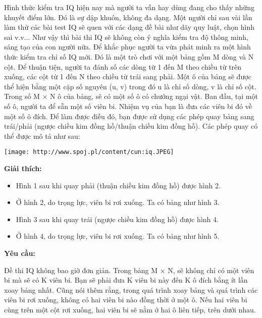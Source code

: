 Hình thức kiểm tra IQ hiện nay mà người ta vẫn hay dùng đang cho thấy những khuyết điểm lớn. Đó là sự dập khuôn, không đa dạng. Một người chỉ sau vài lần làm thử các bài test IQ sẽ quen với các dạng đề bài như dãy quy luật, chọn hình sai v.v... Như vậy thì bài thi IQ sẽ không còn ý nghĩa kiểm tra độ thông minh, sáng tạo của con người nữa. Để khắc phục người ta vừa phát minh ra một hình thức kiểm tra chỉ số IQ mới. Đó là một trò chơi với một bảng gồm M dòng và N cột. Để thuận tiện, người ta đánh số các dòng từ 1 đến M theo chiều từ trên xuống, các cột từ 1 đến N theo chiều từ trái sang phải. Một ô của bảng sẽ được thể hiện bằng một cặp số nguyên (u, v) trong đó u là chỉ số dòng, v là chỉ số cột. Trong số M × N ô của bảng, sẽ có một số ô có chướng ngại vật. Ban đầu, tại một số ô, người ta để sẵn một số viên bi. Nhiệm vụ của bạn là đưa các viên bi đó về một số ô đích. Để làm được điều đó, bạn được sử dụng các phép quay bảng sang trái/phải (ngược chiều kim đồng hồ/thuận chiều kim đồng hồ). Các phép quay có thể được mô tả như sau:


\texttt{[image: http://www.spoj.pl/content/cun:iq.JPEG]}

\textbf{Giải thích:}
\begin{itemize}
	\item Hình 1 sau khi quay phải (thuận chiều kim đồng hồ) được hình 2.
	\item Ở hình 2, do trọng lực, viên bi rơi xuống. Ta có bảng như hình 3.
	\item Hình 3 sau khi quay trái (ngược chiều kim đồng hồ) được hình 4.
	\item Ở hình 4, do trọng lực, viên bi rơi xuống. Ta có bảng như hình 5.
\end{itemize}

\textbf{Yêu cầu:}

Đề thi IQ không bao giờ đơn giản. Trong bảng M × N, sẽ không chỉ có một viên bi mà sẽ có K viên bi. Bạn sẽ phải đưa K viên bi này đến K ô đích bằng ít lần xoay bảng nhất. Cũng nói thêm rằng, trong quá trình xoay bảng và quá trình các viên bi rơi xuống, không có hai viên bi nào đồng thời ở một ô. Nếu hai viên bi cùng trên một cột rơi xuống, hai viên bi sẽ nằm ở hai ô liên tiếp, trên dưới nhau.